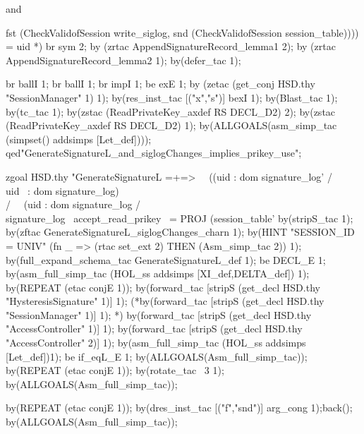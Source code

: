 \documentclass[a4paper,pdftex]{article}
\newenvironment{holz-proof}{\comment}{\endcomment}
\begin{document}
\begin{holz-proof}
  and 

  fst (CheckValidofSession %
  write_siglog,
  snd (CheckValidofSession %
                               session_table)))) = uid *)
br sym 2;
by (zrtac AppendSignatureRecord_lemma1 2);
by (zrtac AppendSignatureRecord_lemma2 1);
by(defer_tac 1);

br ballI 1;
br ballI 1;
br impI 1;
be exE 1;
by (zetac (get_conj HSD.thy "SessionManager" 1) 1);
by(res_inst_tac [("x","s")] bexI 1);
by(Blast_tac 1);
by(tc_tac 1);
by(zstac (ReadPrivateKey_axdef RS DECL_D2) 2);
by(zstac (ReadPrivateKey_axdef RS DECL_D2) 1);
by(ALLGOALS(asm_simp_tac (simpset() addsimps [Let_def])));
qed"GenerateSignatureL_and_siglogChanges_implies_prikey_use";




zgoal HSD.thy
"GenerateSignatureL =+=>                                                        \
\ ((uid : dom signature_log' /\\ uid ~: dom signature_log) \\/                  \
\  (uid : dom signature_log  /\\ signature_log %
\  accept_read_prikey ~= PROJ (session_table' %
by(stripS_tac 1);
by(zftac GenerateSignatureL_siglogChanges_charn 1);
by(HINT "SESSION_ID = UNIV" (fn _ => (rtac set_ext 2) THEN (Asm_simp_tac 2)) 1);
by(full_expand_schema_tac GenerateSignatureL_def 1);
be DECL_E 1;
by(asm_full_simp_tac (HOL_ss addsimps [XI_def,DELTA_def]) 1); 
by(REPEAT (etac conjE 1));
by(forward_tac [stripS (get_decl HSD.thy "HysteresisSignature" 1)] 1);
(*by(forward_tac [stripS (get_decl HSD.thy "SessionManager" 1)] 1); *)
by(forward_tac [stripS (get_decl HSD.thy "AccessController" 1)] 1);
by(forward_tac [stripS (get_decl HSD.thy "AccessController" 2)] 1);
by(asm_full_simp_tac (HOL_ss addsimps [Let_def])1);
be if_eqL_E 1;
by(ALLGOALS(Asm_full_simp_tac));
by(REPEAT (etac conjE 1));
by(rotate_tac ~3 1);
by(ALLGOALS(Asm_full_simp_tac));

by(REPEAT (etac conjE 1));
by(dres_inst_tac [("f","snd")] arg_cong 1);back();
by(ALLGOALS(Asm_full_simp_tac));


\end{holz-proof}
\end{document}
